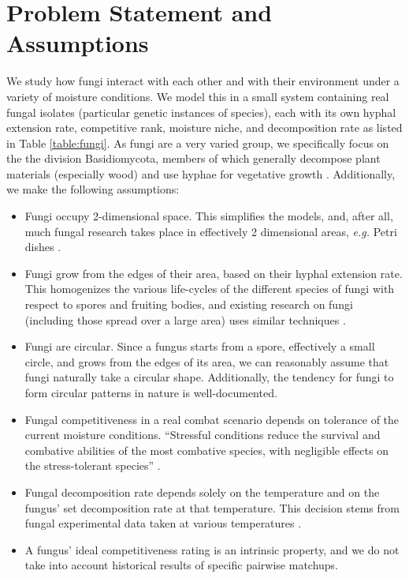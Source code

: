 \documentclass[12pt]{article}
\begin{document}
\section{Problem Statement and Assumptions}
We study how fungi interact with each other and with their environment under a variety of moisture conditions. We model this in a small system containing real fungal isolates (particular genetic instances of species), each with its own hyphal extension rate, competitive rank, moisture niche, and decomposition rate as listed in Table \ref{table:fungi}. As fungi are a very varied group, we specifically focus on the the division Basidiomycota, members of which generally decompose plant materials (especially wood) and use hyphae for vegetative growth \cite{basidiomycota}.  Additionally, we make the following assumptions:
\begin{itemize}
    \item Fungi occupy 2-dimensional space. This simplifies the models, and, after all, much fungal research takes place in effectively 2 dimensional areas, \emph{e.g.} Petri dishes \cite{diversity_begets_diversity}.
    \item Fungi grow from the edges of their area, based on their hyphal extension rate. This homogenizes the various life-cycles of the different species of fungi with respect to spores and fruiting bodies, and existing research on fungi (including those spread over a large area) uses similar techniques \cite{bigboifungus}.
    \item Fungi are circular. Since a fungus starts from a spore, effectively a small circle, and grows from the edges of its area, we can reasonably assume that fungi naturally take a circular shape. Additionally, the tendency for fungi to form circular patterns in nature is well-documented.
    \item Fungal competitiveness in a real combat scenario depends on tolerance of the current moisture conditions. ``Stressful conditions reduce the survival and combative abilities of the most combative species, with negligible effects on the stress-tolerant species'' \cite{untangling}.
    \item Fungal decomposition rate depends solely on the temperature and on the fungus' set decomposition rate at that temperature. This decision stems from fungal experimental data taken at various temperatures \cite{trait-based}.
    \item A fungus' ideal competitiveness rating is an intrinsic property, and we do not take into account historical results of specific pairwise matchups. 

\end{itemize}
\end{document}
